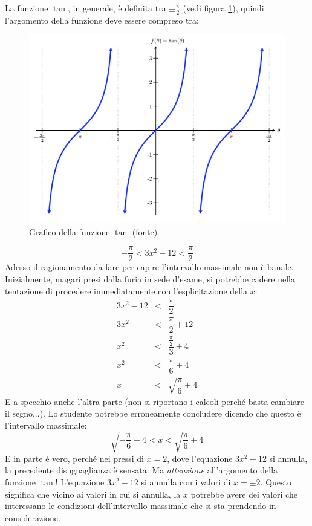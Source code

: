 \documentclass[a4paper]{article}
\begin{document}
	\noindent
	La funzione $\tan$, in generale, è definita tra $\pm \frac{\pi}{2}$ (vedi figura \ref{fig: esame 21 giugno 2023 - Gruppo A - 1 esercizio}), quindi l'argomento della funzione deve essere compreso tra:
	\begin{figure}[!htp]
		\centering
		\includegraphics[width=\textwidth]{img/tangentgraph.png}
		\caption{Grafico della funzione $\tan$ (\href{https://mathbooks.unl.edu/PreCalculus/tangent-and-cofunctions.html}{fonte}).}
		\label{fig: esame 21 giugno 2023 - Gruppo A - 1 esercizio}
	\end{figure}
	\begin{equation*}
		-\dfrac{\pi}{2} < 3x^{2} - 12 < \dfrac{\pi}{2}
	\end{equation*}
	Adesso il ragionamento da fare per capire l'intervallo massimale non è banale. Inizialmente, magari presi dalla furia in sede d'esame, si potrebbe cadere nella tentazione di procedere immediatamente con l'esplicitazione della $x$:
	\begin{equation*}
		\begin{array}{rcl}
			3x^{2} - 12 &<& \dfrac{\pi}{2} \\ [1em]
			3x^{2} &<& \dfrac{\pi}{2} + 12 \\ [1em]
			x^{2} &<& \dfrac{\frac{\pi}{2}}{3} + 4 \\ [1em]
			x^{2} &<& \dfrac{\pi}{6} + 4 \\ [1em]
			x &<& \sqrt{\dfrac{\pi}{6} + 4}
		\end{array}
	\end{equation*}
	E a specchio anche l'altra parte (non si riportano i calcoli perché basta cambiare il segno...). Lo studente potrebbe erroneamente concludere dicendo che questo è l'intervallo massimale:
	\begin{equation*}
		\sqrt{- \dfrac{\pi}{6} + 4} < x < \sqrt{\dfrac{\pi}{6} + 4}
	\end{equation*}
	E in parte è vero, perché nei pressi di $x = 2$, dove l'equazione $3x^{2}-12$ si annulla, la precedente disuguaglianza è sensata. Ma \emph{attenzione} all'argomento della funzione $\tan$! L'equazione $3x^{2} - 12$ si annulla con i valori di $x = \pm 2$. Questo significa che vicino ai valori in cui si annulla, la $x$ potrebbe avere dei valori che interessano le condizioni dell'intervallo massimale che si sta prendendo in considerazione.\newline
\end{document}

